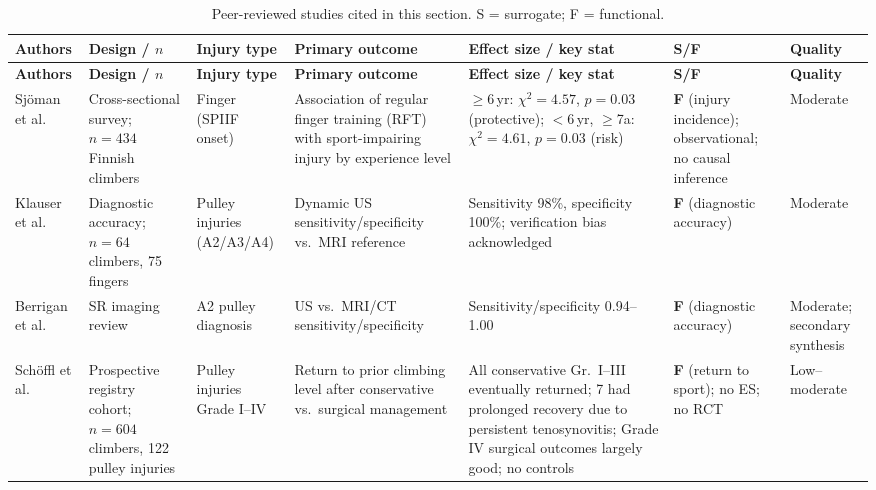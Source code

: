 {\footnotesize
\setlength{\tabcolsep}{4pt}
\renewcommand{\arraystretch}{1.2}
\begin{longtable}{>{\raggedright\arraybackslash}p{2.0cm}
                  >{\raggedright\arraybackslash}p{1.8cm}
                  >{\raggedright\arraybackslash}p{1.8cm}
                  >{\raggedright\arraybackslash}p{2.6cm}
                  >{\raggedright\arraybackslash}p{2.8cm}
                  >{\raggedright\arraybackslash}p{1.2cm}
                  >{\raggedright\arraybackslash}p{1.8cm}}
\caption{Peer-reviewed studies cited in this section. S = surrogate; F = functional.}\label{tab:injury_studies}\\
\toprule
\textbf{Authors} & \textbf{Design / $n$} & \textbf{Injury type} & \textbf{Primary outcome} & \textbf{Effect size / key stat} & \textbf{S/F} & \textbf{Quality} \\
\midrule
\endfirsthead
\toprule
\textbf{Authors} & \textbf{Design / $n$} & \textbf{Injury type} & \textbf{Primary outcome} & \textbf{Effect size / key stat} & \textbf{S/F} & \textbf{Quality} \\
\midrule
\endhead
\bottomrule
\endfoot
\bottomrule
\endlastfoot

Sjöman et al.\ \cite{SGJ23}
& Cross-sectional survey; $n=434$ Finnish climbers
& Finger (SPIIF onset)
& Association of regular finger training (RFT) with sport-impairing injury by experience level
& $\geq$6\,yr: $\chi^2=4.57$, $p=0.03$ (protective); $<$6\,yr, $\geq$7a: $\chi^2=4.61$, $p=0.03$ (risk)
& \textbf{F} (injury incidence); observational; no causal inference
& Moderate \\

\addlinespace

Klauser et al.\ \cite{KFB+02}
& Diagnostic accuracy; $n=64$ climbers, 75 fingers
& Pulley injuries (A2/A3/A4)
& Dynamic US sensitivity/specificity vs.\ MRI reference
& Sensitivity 98\%, specificity 100\%; verification bias acknowledged
& \textbf{F} (diagnostic accuracy)
& Moderate \\

\addlinespace

Berrigan et al.\ \cite{BWC+21}
& SR imaging review
& A2 pulley diagnosis
& US vs.\ MRI/CT sensitivity/specificity
& Sensitivity/specificity 0.94--1.00
& \textbf{F} (diagnostic accuracy)
& Moderate; secondary synthesis \\

\addlinespace

Sch\"{o}ffl et al.\ \cite{SHWS03}
& Prospective registry cohort; $n=604$ climbers, 122 pulley injuries
& Pulley injuries Grade I--IV
& Return to prior climbing level after conservative vs.\ surgical management
& All conservative Gr.~I--III eventually returned; 7 had prolonged recovery due to persistent tenosynovitis; Grade IV surgical outcomes largely good; no controls
& \textbf{F} (return to sport); no ES; no RCT
& Low--moderate \\


\end{longtable}}
